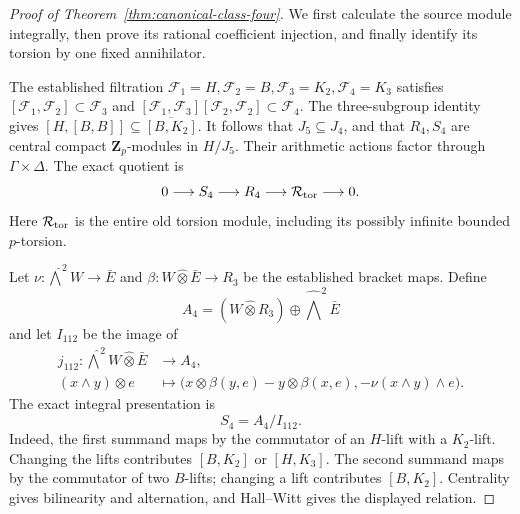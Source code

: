 \begin{proof}[Proof of Theorem~\ref{thm:canonical-class-four}]
We first calculate the source module integrally, then
prove its rational coefficient injection, and finally
identify its torsion by one fixed annihilator.

The established filtration
$\mathcal F_1=H,\mathcal F_2=B,\mathcal F_3=K_2,\mathcal F_4=K_3$ satisfies
$[\mathcal F_1,\mathcal F_2]\subset \mathcal F_3$ and
$[\mathcal F_1,\mathcal F_3][\mathcal F_2,\mathcal F_2]\subset \mathcal F_4$.
The three-subgroup identity gives
$[H,[B,B]]\subseteq\overline{[B,K_2]}$.
It follows that $J_5\subseteq J_4$, and that $R_4,S_4$
are central compact $\mathbf Z_p$-modules in $H/J_5$.
Their arithmetic actions factor through
$\Gamma\times\Delta$. The exact quotient is
\begin{equation}\label{eq:class4-old-torsion}
 0\longrightarrow S_4\longrightarrow R_4
     \longrightarrow \mathcal R_{\rm tor}\longrightarrow0.
\end{equation}
Here $\mathcal R_{\rm tor}$ is the entire old torsion module,
including its possibly infinite bounded $p$-torsion.

Let $\nu:\widehat\bigwedge^2W\to\bar E$ and
$\beta:W\widehat\otimes\bar E\to R_3$ be the established
bracket maps. Define
\[
 A_4=(W\widehat\otimes R_3)\oplus
                          \widehat\bigwedge^2\bar E
\]
and let $I_{112}$ be the image of
\begin{align*}
 j_{112}:\widehat\bigwedge^2W\widehat\otimes\bar E
          &\longrightarrow A_4,\\
 (x\wedge y)\otimes e&\longmapsto
 \bigl(x\otimes\beta(y,e)-y\otimes\beta(x,e),
                         -\nu(x\wedge y)\wedge e\bigr).
\end{align*}
The exact integral presentation is
\begin{equation}\label{eq:class4-presentation}
                         S_4=A_4/I_{112}.
\end{equation}
Indeed, the first summand maps by the commutator of an
$H$-lift with a $K_2$-lift. Changing the lifts contributes
$[B,K_2]$ or $[H,K_3]$. The second summand maps by the
commutator of two $B$-lifts; changing a lift contributes
$[B,K_2]$. Centrality gives bilinearity and alternation,
and Hall--Witt gives the displayed relation.


\end{proof}
